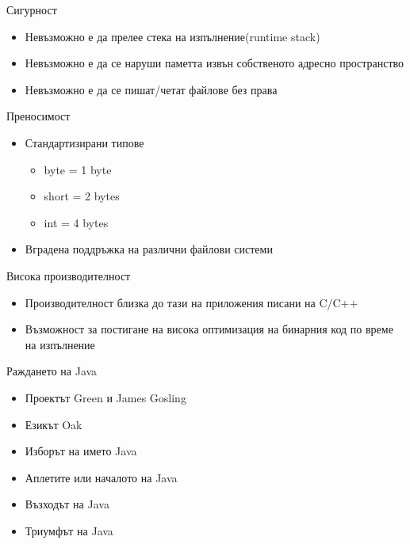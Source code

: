 \documentclass{beamer}
\begin{document}
\begin{frame}{Сигурност}
  \transdissolve  
  \begin{itemize}
   \item Невъзможно е да прелее стека на
    изпълнение(runtime stack) \pause
   \item Невъзможно е да се наруши паметта
    извън собственото адресно
    пространство \pause
   \item Невъзможно е да се пишат/четат
    файлове без права
  \end{itemize}
\end{frame}

\begin{frame}{Преносимост}
  \transdissolve
  \begin{itemize}
  \item Стандартизирани типове
    \begin{itemize}
      \item byte = 1 byte
      \item short = 2 bytes
      \item int = 4 bytes
    \end{itemize}
    \pause
  \item Вградена поддръжка на различни
  файлови системи
  \end{itemize}
\end{frame}

\begin{frame}{Висока производителност}
  \transdissolve
  \begin{itemize}
  \item Производителност близка до тази на
  приложения писани на C/C++ \pause
  \item Възможност за постигане на висока
  оптимизация на бинарния код по време
  на изпълнение
\end{itemize}
\end{frame}

\begin{frame}{Раждането на Java}
  \transdissolve
  \begin{itemize}
    \item Проектът Green и James Gosling \pause
    \item Езикът Oak \pause
    \item Изборът на името Java \pause
    \item Аплетите или началото на Java \pause
    \item Възходът на Java \pause
    \item Триумфът на Java
  \end{itemize}
\end{frame}
\end{document}
